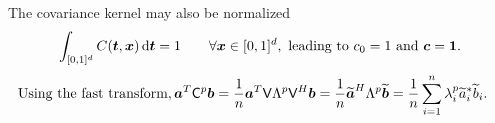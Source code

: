\documentclass[handout, 10pt,compress,xcolor={usenames,dvipsnames}]{beamer} %
\renewcommand{\mLambda}{\Lambda}
\newcommand{\D}[1]{\text{d}{#1}}
\begin{document}
\begin{frame}
\begin{subequations}
\end{subequations}
\vspace{-1.5ex}
The covariance kernel may also be normalized 
\begin{align}
\label{addAssump}
\int_{[0,1]^d} C(\vt,\vx) \, \D \vt = 1 \qquad \forall \vx \in [0,1]^d,
\text{
	leading to $
	c_0 = 1$ and $\vc = \vone$}.
\end{align}
\vspace{-1ex}
\begin{align*}
\text{Using the fast transform},
\va^T\mC^p\vb &= \frac 1n \va^T \mV \mLambda^p \mV^H \vb
= \frac 1n \widetilde{\va}^H\mLambda^p \widetilde{\vb}
= \frac 1n \sum_{i=1}^n \lambda_i^p \widetilde{a}_i^* \widetilde{b}_i.
\end{align*}

\end{frame}
\end{document}

